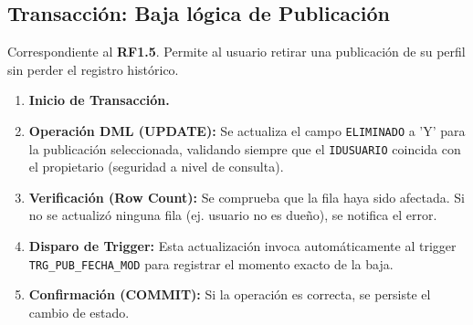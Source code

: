 \subsection{Transacción: Baja lógica de Publicación}
Correspondiente al \textbf{RF1.5}. Permite al usuario retirar una publicación de su perfil sin perder el registro histórico.

\begin{enumerate}
    \item \textbf{Inicio de Transacción.}
    \item \textbf{Operación DML (UPDATE):} Se actualiza el campo \texttt{ELIMINADO} a 'Y' para la publicación seleccionada, validando siempre que el \texttt{IDUSUARIO} coincida con el propietario (seguridad a nivel de consulta).
    \item \textbf{Verificación (Row Count):} Se comprueba que la fila haya sido afectada. Si no se actualizó ninguna fila (ej. usuario no es dueño), se notifica el error.
    \item \textbf{Disparo de Trigger:} Esta actualización invoca automáticamente al trigger \texttt{TRG\_PUB\_FECHA\_MOD} para registrar el momento exacto de la baja.
    \item \textbf{Confirmación (COMMIT):} Si la operación es correcta, se persiste el cambio de estado.
\end{enumerate}
